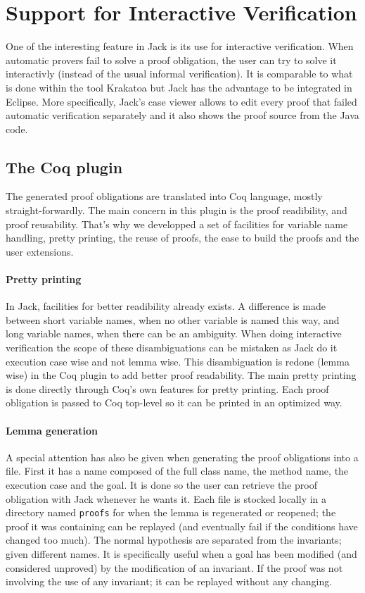 


\section{Support for Interactive Verification}\label{SecInteractive}
One of the interesting feature in Jack is its use for interactive 
verification. When automatic provers fail to solve a proof obligation,
the user can try to solve it interactivly (instead of the usual 
informal verification). It is comparable to what is done within the tool
 Krakatoa but Jack has the advantage to be integrated in Eclipse.
More specifically, Jack's case viewer allows to edit every proof that 
failed automatic verification separately and 
it also shows the proof source from the Java code. 
\subsection{The Coq plugin}
The generated  proof obligations are translated into Coq language, mostly
straight-forwardly. The main concern in this plugin is the proof readibility,
and proof reusability.
That's why we developped a set of facilities for variable name handling,
pretty printing, the reuse of proofs, the ease to build the proofs and the 
user extensions.

\paragraph{Pretty printing}
In Jack, facilities for better readibility already exists.
A difference is made between short variable names, 
when no other variable is named this way,
 and long variable names, when there can be an ambiguity. 
When doing interactive verification the scope of these disambiguations 
can be mistaken as Jack do it execution case wise and not lemma wise.
This disambiguation is redone (lemma wise) 
in the Coq plugin to add better proof readability.
The main pretty printing is done directly through Coq's own features for
pretty printing. Each proof obligation is passed to Coq top-level so it
can be printed in an optimized way.

\paragraph{Lemma generation} 
A special attention has also be given when generating the proof obligations 
into a file. First it has a name composed of the full class name, the method
name, the execution case and the goal. It is done so the user can retrieve 
the proof obligation with Jack whenever he wants it. Each file is stocked
locally in a directory named {\tt proofs} 
for when the lemma is regenerated or reopened; the proof it was containing
can be replayed (and eventually fail if the conditions have changed too much).
The normal hypothesis are separated from the invariants; given different names.
It is specifically useful when a goal has been modified (and considered 
unproved) by the modification of an invariant. If the proof was not involving
the use of any invariant; it can be replayed without any changing.

